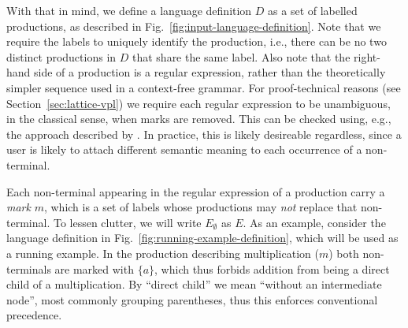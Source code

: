 \documentclass[acmsmall,review,anonymous]{acmart}\settopmatter{printfolios=true,printccs=false,printacmref=false}
\begin{document}
With that in mind, we define a language definition $D$ as a set of labelled productions, as described in Fig.~\ref{fig:input-language-definition}. Note that we require the labels to uniquely identify the production, i.e., there can be no two distinct productions in $D$ that share the same label. Also note that the right-hand side of a production is a regular expression, rather than the theoretically simpler sequence used in a context-free grammar. For proof-technical reasons (see Section~\ref{sec:lattice-vpl}) we require each regular expression to be unambiguous, in the classical sense, when marks are removed. This can be checked using, e.g., the approach described by \citet{brabrandTypedUnambiguousPattern2010}. In practice, this is likely desireable regardless, since a user is likely to attach different semantic meaning to each occurrence of a non-terminal.

Each non-terminal appearing in the regular expression of a production carry a \emph{mark} $m$, which is a set of labels whose productions may \emph{not} replace that non-terminal. To lessen clutter, we will write $E_\emptyset$ as $E$. As an example, consider the language definition in Fig.~\ref{fig:running-example-definition}, which will be used as a running example. In the production describing multiplication ($m$) both non-terminals are marked with $\{a\}$, which thus forbids addition from being a direct child of a multiplication. By ``direct child'' we mean ``without an intermediate node'', most commonly grouping parentheses, thus this enforces conventional precedence.
\end{document}
